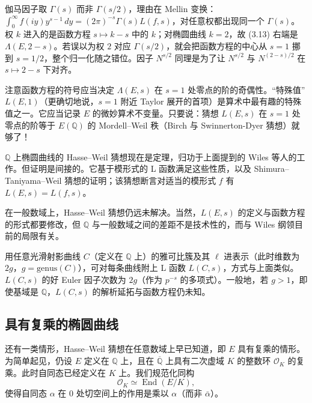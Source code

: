 \begin{annote}
伽马因子取 $\Gamma(s)$ 而非 $\Gamma(s/2)$，理由在 Mellin 变换：$\int_0^\infty f(iy)y^{s-1}\,dy=(2\pi)^{-s}\Gamma(s)L(f,s)$，对任意权都出现同一个 $\Gamma(s)$。权 $k$ 进入的是函数方程 $s\mapsto k-s$ 中的 $k$；对椭圆曲线 $k=2$，故 (3.13) 右端是 $\Lambda(E,2-s)$。若误以为权 $2$ 对应 $\Gamma(s/2)$，就会把函数方程的中心从 $s=1$ 挪到 $s=1/2$，整个归一化随之错位。因子 $N^{s/2}$ 同理是为了让 $N^{s/2}$ 与 $N^{(2-s)/2}$ 在 $s\mapsto2-s$ 下对齐。
\par\vspace{0.15em}{\raggedleft 【来源：Iwaniec--Kowalski《Analytic Number Theory》第 5 章（A）；Shimura《Introduction to the Arithmetic Theory of Automorphic Forms》（A）】\par}
\end{annote}

注意函数方程的符号应当决定 $\Lambda(E,s)$ 在 $s=1$ 处零点的阶的奇偶性。“特殊值” $L(E,1)$（更确切地说，$s=1$ 附近 Taylor 展开的首项）是算术中最有趣的特殊值之一。它应当记录 $E$ 的微妙算术不变量。只要说：猜想 $L(E,s)$ 在 $s=1$ 处零点的阶等于 $E(\mathbb{Q})$ 的 Mordell--Weil 秩（Birch 与 Swinnerton-Dyer 猜想）就够了！

$\mathbb{Q}$ 上椭圆曲线的 Hasse--Weil 猜想现在是定理，归功于上面提到的 Wiles 等人的工作。但证明是间接的。它基于模形式的 L 函数满足这些性质，以及 Shimura--Taniyama--Weil 猜想的证明；该猜想断言对适当的模形式 $f$ 有 $L(E,s)=L(f,s)$。

在一般数域上，Hasse--Weil 猜想仍远未解决。当然，$L(E,s)$ 的定义与函数方程的形式都要修改，但 $\mathbb{Q}$ 与一般数域之间的差距不是技术性的，而与 Wiles 纲领目前的局限有关。

用任意光滑射影曲线 $C$（定义在 $\mathbb{Q}$ 上）的雅可比簇及其 $\ell$ 进表示（此时维数为 $2g$，$g=\mathrm{genus}(C)$），可对每条曲线附上 L 函数 $L(C,s)$，方式与上面类似。$L(C,s)$ 的好 Euler 因子次数为 $2g$（作为 $p^{-s}$ 的多项式）。一般地，若 $g>1$，即使基域是 $\mathbb{Q}$，$L(C,s)$ 的解析延拓与函数方程仍未知。

\subsection{具有复乘的椭圆曲线}\label{c5:sec:3.4}

还有一类情形，Hasse--Weil 猜想在任意数域上早已知道，即 $E$ 具有复乘的情形。为简单起见，仍设 $E$ 定义在 $\mathbb{Q}$ 上，且在 $\overline{\mathbb{Q}}$ 上具有二次虚域 $K$ 的整数环 $\mathcal{O}_K$ 的复乘。此时自同态已经定义在 $K$ 上。我们规范化同构
\begin{equation}\tag{3.14}\label{c5:eq:3.14}
\mathcal{O}_K\simeq\operatorname{End}(E/K),
\end{equation}
使得自同态 $\alpha$ 在 $0$ 处切空间上的作用是乘以 $\alpha$（而非 $\bar\alpha$）。

